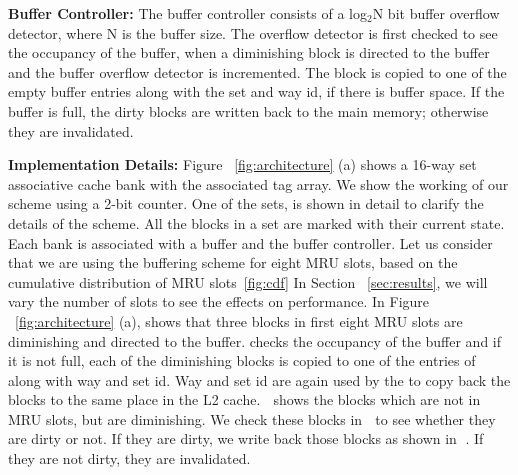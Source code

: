 \noindent\textbf{Buffer Controller:}
The buffer controller consists of a log$_2$N bit buffer overflow detector, where N is the buffer size.
The overflow detector is first checked to see the occupancy of the buffer,
when a diminishing block is directed to the buffer and the buffer overflow detector is incremented.
The block is copied to one of the empty buffer entries along with the set and way id, if there is
buffer space.
If the buffer is full, the dirty blocks are written back to the main memory; otherwise they are  invalidated.

\noindent\textbf{Implementation Details:}
Figure ~\ref{fig:architecture} (a) shows a 16-way set associative cache bank with the associated tag array.
We show the working of
our scheme using a 2-bit counter.  One of the sets, is shown in detail to clarify the details of the scheme.
All the blocks in a set are marked with their current state. Each bank is  associated with a buffer and the buffer controller.
Let us consider that we are using the buffering scheme for eight MRU slots, based on the cumulative distribution
of MRU slots~\ref{fig:cdf}
In Section ~\ref{sec:results}, we will vary the number of slots to see the effects on performance.
In Figure  ~\ref{fig:architecture} (a),  shows that three blocks in first eight MRU slots are diminishing and directed to the buffer.  checks
the occupancy of the buffer and if it is not full, each of the diminishing blocks is copied to one of the entries
of  along with way and set id. Way and set id are again used by the   to copy back the blocks to
the same place in the L2 cache. \textcircled{\raisebox{-.9pt}{A}} shows the blocks which are not in MRU slots,
but are diminishing. We check these blocks in \textcircled{\raisebox{-.9pt}{B}} to see whether they are dirty or not.
If they are dirty, we write back those blocks as shown in \textcircled{\raisebox{-.9pt}{C}}.  If they are not dirty, they are invalidated.



\begin{figure*} [t]
\centering
  \caption{\label{fig:cdf} \scriptsize \bf Cumulative Distribution of Dead Blocks per Bank with number of ways.}
\end{figure*}


